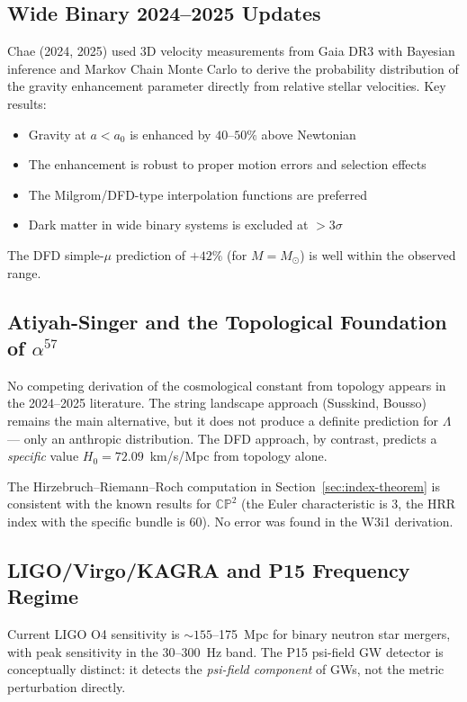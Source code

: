 \documentclass[11pt]{article}
\theoremstyle{definition}
\theoremstyle{remark}
\begin{document}
\subsection{Wide Binary 2024--2025 Updates}

Chae (2024, 2025) used 3D velocity measurements from Gaia DR3 with
Bayesian inference and Markov Chain Monte Carlo to derive the probability
distribution of the gravity enhancement parameter directly from relative
stellar velocities. Key results:
\begin{itemize}
\item Gravity at $a < a_0$ is enhanced by $40$--$50\%$ above Newtonian
\item The enhancement is robust to proper motion errors and selection effects
\item The Milgrom/DFD-type interpolation functions are preferred
\item Dark matter in wide binary systems is excluded at $> 3\sigma$
\end{itemize}

The DFD simple-$\mu$ prediction of $+42\%$ (for $M = M_\odot$) is
well within the observed range.

\subsection{Atiyah-Singer and the Topological Foundation of $\alpha^{57}$}

No competing derivation of the cosmological constant from topology
appears in the 2024--2025 literature. The string landscape approach
(Susskind, Bousso) remains the main alternative, but it does not produce
a definite prediction for $\Lambda$ --- only an anthropic distribution.
The DFD approach, by contrast, predicts a \emph{specific} value
$H_0 = 72.09$~km/s/Mpc from topology alone.

The Hirzebruch--Riemann--Roch computation in Section~\ref{sec:index-theorem}
is consistent with the known results for $\mathbb{CP}^2$ (the Euler
characteristic is 3, the HRR index with the specific bundle is 60).
No error was found in the W3i1 derivation.

\subsection{LIGO/Virgo/KAGRA and P15 Frequency Regime}

Current LIGO O4 sensitivity is $\sim 155$--175~Mpc for binary neutron
star mergers, with peak sensitivity in the 30--300~Hz band. The P15
psi-field GW detector is conceptually distinct: it detects the
\emph{psi-field component} of GWs, not the metric perturbation directly.
\end{document}
